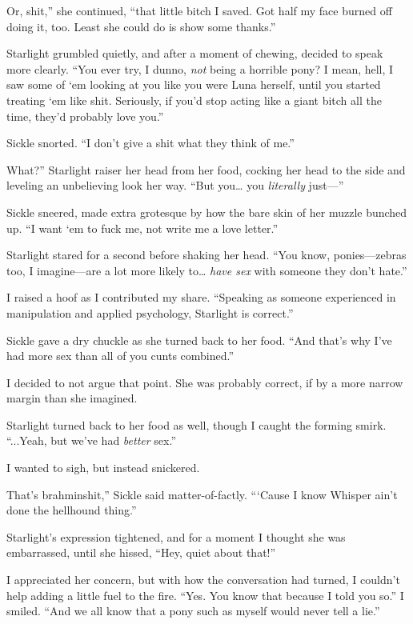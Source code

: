 \leavevmode{}Or, shit,” she continued, “that little bitch I saved. Got half my face burned off doing it, too. Least she could do is show some thanks.”

Starlight grumbled quietly, and after a moment of chewing, decided to speak more clearly. “You ever try, I dunno, \textit{not} being a horrible pony? I mean, hell, I saw some of ‘em looking at you like you were Luna herself, until you started treating ‘em like shit. Seriously, if you’d stop acting like a giant bitch all the time, they’d probably love you.”

Sickle snorted. “I don’t give a shit what they think of me.”

\leavevmode{}What?” Starlight raiser her head from her food, cocking her head to the side and leveling an unbelieving look her way. “But you… you \textit{literally} just—”

Sickle sneered, made extra grotesque by how the bare skin of her muzzle bunched up. “I want ‘em to fuck me, not write me a love letter.”

Starlight stared for a second before shaking her head. “You know, ponies—zebras too, I imagine—are a lot more likely to… \textit{have sex} with someone they don’t hate.”

I raised a hoof as I contributed my share. “Speaking as someone experienced in manipulation and applied psychology, Starlight is correct.”

Sickle gave a dry chuckle as she turned back to her food. “And that’s why I’ve had more sex than all of you cunts combined.”

I decided to not argue that point. She was probably correct, if by a more narrow margin than she imagined.

Starlight turned back to her food as well, though I caught the forming smirk. “...Yeah, but we’ve had \textit{better} sex.”

I wanted to sigh, but instead snickered.

\leavevmode{}That’s brahminshit,” Sickle said matter-of-factly. “‘Cause I know Whisper ain’t done the hellhound thing.”

Starlight’s expression tightened, and for a moment I thought she was embarrassed, until she hissed, “Hey, quiet about that!”

I appreciated her concern, but with how the conversation had turned, I couldn’t help adding a little fuel to the fire. “Yes. You know that because I told you so.” I smiled. “And we all know that a pony such as myself would never tell a lie.”

